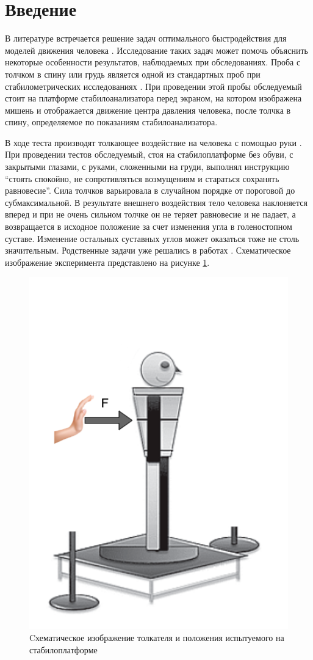 \documentclass[a4paper,12pt, openany]{book}
\theoremstyle{plain} %
\theoremstyle{definition} %
\theoremstyle{remark} %
\numberwithin{equation}{chapter}
\begin{document}
\thispagestyle{empty} %
\normalsize{
\newpage

\tableofcontents

\newpage


\chapter*{Введение}
В литературе встречается решение задач оптимального быстродействия для моделей движения человека \cite{pandy,humanMovements}. Исследование таких задач может помочь объяснить некоторые особенности результатов, наблюдаемых при обследованиях.
Проба с толчком в спину или грудь является одной из стандартных проб
при стабилометрических исследованиях \cite{pusher,kozlovskay}. При проведении этой пробы
обследуемый стоит на платформе стабилоанализатора перед экраном, на
котором изображена мишень и отображается движение центра давления
человека, после толчка в спину, определяемое по показаниям стабилоанализатора.

В ходе теста производят толкающее воздействие на человека с помощью руки \cite{pusher}.
При проведении тестов обследуемый, стоя на стабилоплатформе без обуви,
с закрытыми глазами, с руками, сложенными на груди, выполнял инструкцию
“стоять спокойно, не сопротивляться возмущениям и стараться сохранять равновесие”.
Сила толчков варьировала в случайном порядке от пороговой до субмаксимальной. В результате внешнего
воздействия тело человека наклоняется вперед и при не очень сильном толчке
он не теряет равновесие и не падает, а возвращается в исходное
положение за счет изменения угла в голеностопном суставе. Изменение
остальных суставных углов может оказаться тоже не столь значительным.
Родственные задачи уже решались в работах \cite{PAKrychinin,kruchinMetoda}.
Схематическое изображение эксперимента представлено на рисунке \ref{fig:pusher}.
\begin{figure}[h!]
    \centering
    \includegraphics[width=0.35\linewidth]{human2.png}
    \caption{Cхематическое изображение толкателя и
        положения испытуемого на стабилоплатформе}
    \label{fig:pusher}
\end{figure}

}
\end{document}
